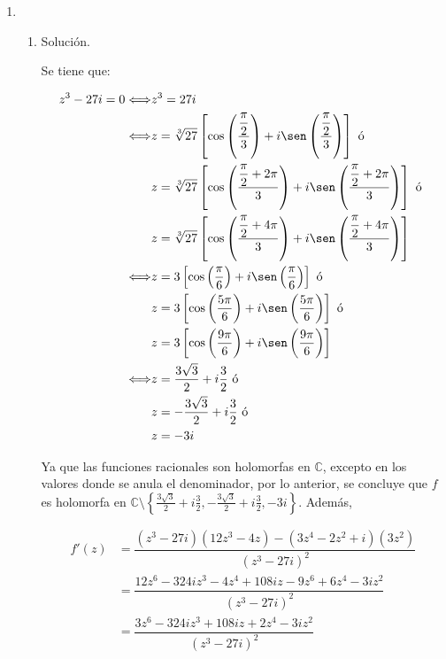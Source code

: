 \documentclass[12pt, fleqn]{article}
\newcommand{\complejos}{\mathbb{C}}
\newcommand{\cis}[2]{\cos \left( #1 \right) #2 i \sen \left( #1 \right)}
\begin{document}
	\begin{enumerate}
		\item \begin{enumerate}
			\item Solución.
			
			Se tiene que:

			\begin{align*}
				z^3 - 27i = 0 \Longleftrightarrow & z^3 = 27i \\
				\Longleftrightarrow & z = \sqrt[3]{27} \left[ \cis{\dfrac{\dfrac{\pi}{2}}{3}}{+} \right] \mbox{ ó } \\
				& z = \sqrt[3]{27} \left[ \cis{\dfrac{\dfrac{\pi}{2} + 2 \pi}{3}}{+} \right] \mbox{ ó } \\
				& z = \sqrt[3]{27} \left[ \cis{\dfrac{\dfrac{\pi}{2} + 4 \pi}{3}}{+} \right] \\
				\Longleftrightarrow & z = 3 \left[ \cis{\dfrac{\pi}{6}}{+} \right] \mbox{ ó } \\
				& z = 3 \left[ \cis{\dfrac{5 \pi}{6}}{+} \right] \mbox{ ó } \\
				& z = 3 \left[ \cis{\dfrac{9 \pi}{6}}{+} \right] \\
				\Longleftrightarrow & z = \dfrac{3 \sqrt{3}}{2} + i \dfrac{3}{2} \mbox{ ó } \\
				& z = - \dfrac{3 \sqrt{3}}{2} + i \dfrac{3}{2} \mbox{ ó } \\
				& z = -3i \\
			\end{align*}
			
			Ya que las funciones racionales son holomorfas en $ \complejos $, excepto en los valores donde se anula el denominador, por lo anterior, se concluye que $f$ es holomorfa en $ \complejos \setminus \left\lbrace \frac{3 \sqrt{3}}{2} + i \frac{3}{2}, - \frac{3 \sqrt{3}}{2} + i \frac{3}{2}, -3i \right\rbrace $. Además,

			\begin{align*}
				f'(z) &= \dfrac{(z^3 - 27i)(12z^3 - 4z) - (3z^4 - 2z^2 + i) (3z^2)}{(z^3 - 27i)^2} \\
				&= \dfrac{12z^6 - 324 iz^3 - 4z^4 + 108iz - 9z^6 + 6z^4 - 3iz^2}{(z^3 - 27i)^2} \\
				&= \dfrac{3z^6 - 324 iz^3 + 108iz + 2z^4 - 3iz^2}{(z^3 - 27i)^2} \\
			\end{align*}


\end{enumerate}
\end{enumerate}
\end{document}
